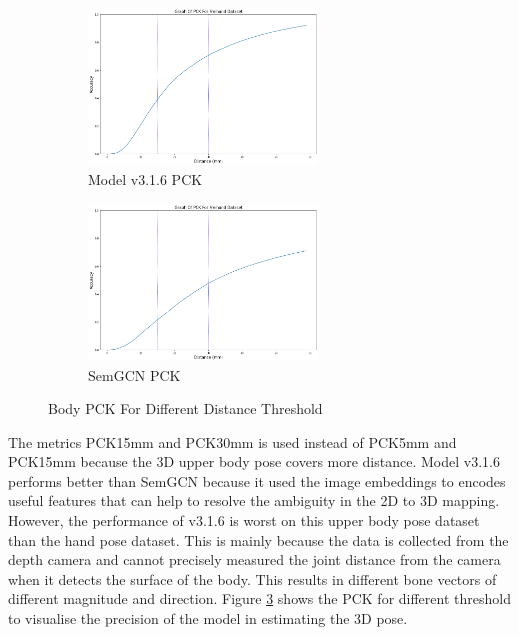 \begin{figure}[ht]
    \begin{center}
        \begin{subfigure}[b]{0.49\textwidth}
            \includegraphics[width=230px]{assets/custom_pck.png}
            \caption{Model v3.1.6 PCK}
            \label{fig:custom_pck}
        \end{subfigure}
        \begin{subfigure}[b]{0.49\textwidth}
            \includegraphics[width=230px]{assets/semgcn_pck.png}
            \caption{SemGCN PCK}
            \label{fig:semgcn_pck}
        \end{subfigure}
	    \caption{Body PCK For Different Distance Threshold}
	    \label{fig:body_pck_for_different_thresholds}        
    \end{center}
\end{figure}

\noindent
The metrics PCK15mm and PCK30mm is used instead of PCK5mm and PCK15mm because the 3D upper body pose covers more distance. Model v3.1.6 performs better than SemGCN because it used the image embeddings to encodes useful features that can help to resolve the ambiguity in the 2D to 3D mapping. However, the performance of v3.1.6 is worst on this upper body pose dataset than the hand pose dataset. This is mainly because the data is collected from the depth camera and cannot precisely measured the joint distance from the camera when it detects the surface of the body. This results in different bone vectors of different magnitude and direction. Figure \ref{fig:body_pck_for_different_thresholds} shows the PCK for different threshold to visualise the precision of the model in estimating the 3D pose.

